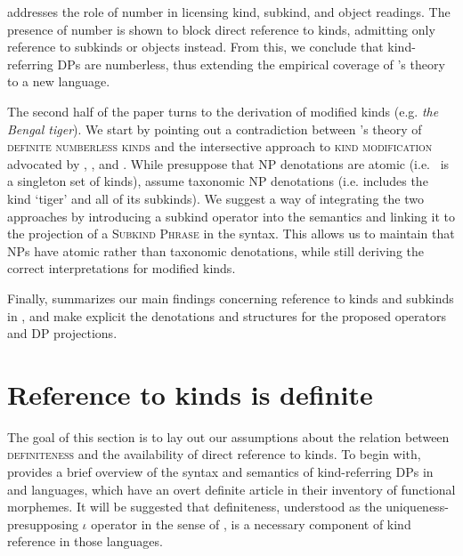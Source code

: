 \documentclass[output=paper]{langscibook}
\begin{document}
 addresses the role of number in licensing kind, subkind, and object readings. The presence of number is shown to block direct reference to kinds, admitting only reference to subkinds or objects instead. From this, we conclude that  kind-referring DPs are numberless, thus extending the empirical coverage of \citeauthor{Borik.Espinal2012}'s theory to a new language.

The second half of the paper turns to the derivation of modified kinds (e.g. \textit{the Bengal tiger}). We start   by pointing out a contradiction between \citeauthor{Borik.Espinal2012}'s theory of \textsc{definite numberless kinds} and the intersective approach to \textsc{kind modification} advocated by \citet{McNally.Boleda2004}, \citet{Wagiel2014}, and \citet{Borik.Espinal2015}. While \citeauthor{Borik.Espinal2012} presuppose that NP denotations are atomic (i.e.\  is a singleton set of kinds), \citet{McNally.Boleda2004} assume taxonomic NP denotations (i.e.  includes the kind `tiger' and all of its subkinds). We suggest a way of integrating the two approaches by introducing a subkind operator  into the semantics and linking it to the projection of a \textsc{Subkind Phrase} in the syntax. This allows us to maintain that NPs have atomic rather than taxonomic denotations, while still deriving the correct interpretations for modified kinds.

Finally,  summarizes our main findings concerning reference to kinds and subkinds in , and make explicit the denotations and structures for the proposed operators and DP projections.


\section{Reference to kinds is definite}\label{sec:2-nominals-def}

The goal of this section is to lay out our assumptions about the relation between \textsc{definiteness} and the availability of direct reference to kinds. To begin with,  provides a brief overview of the syntax and semantics of kind-referring DPs in  and  languages, which have an overt definite article in their inventory of functional morphemes. It will be suggested that definiteness, understood as the uniqueness-presupposing $\iota$ operator in the sense of \citet{Partee1987}, is a necessary component of kind reference in those languages.
\end{document}
